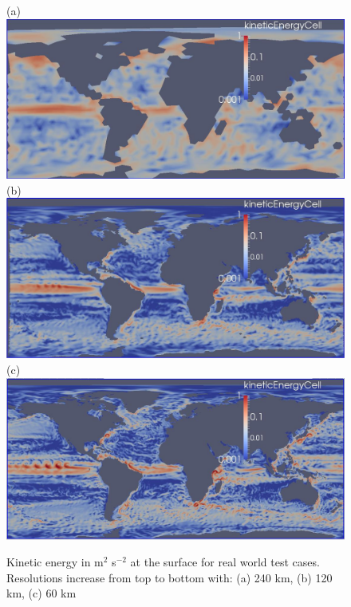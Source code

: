 \begin{figure}[H!]
	\centering
(a)	\includegraphics[scale=0.36]{ocean/figures/m72m_240km_yr11_k1_ke.jpg}\\
(b)	\includegraphics[scale=0.36]{ocean/figures/m72g_120km_yr11_k1_ke.jpg}\\
(c)	\includegraphics[scale=0.36]{ocean/figures/m72h_60km_yr11_k1_ke.jpg}
	\caption{Kinetic energy in m$^2$ s$^{-2}$ at the surface for real world test cases.  Resolutions increase from top to bottom with: (a) 240 km, (b) 120 km, (c) 60 km} %
	\label{fig:overflow}
\end{figure}

